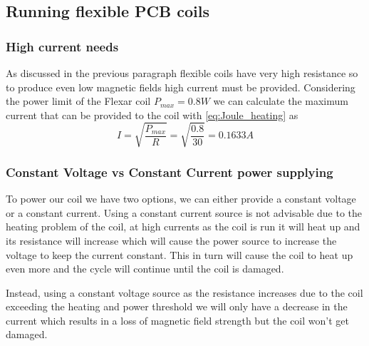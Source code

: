 \subsection{Running flexible PCB coils}

\subsubsection{High current needs}
As discussed in the previous paragraph flexible coils have very high resistance so to produce even low magnetic fields high current must be provided.
Considering the power limit of the Flexar coil $P_{max} = 0.8W$ we can calculate the maximum current that can be provided to the coil with \ref{eq:Joule_heating} as
\begin{equation}
    I = \sqrt{\frac{P_{max}}{R}} = \sqrt{\frac{0.8}{30}} = 0.1633A
\end{equation}

\subsubsection{Constant Voltage vs Constant Current power supplying}
To power our coil we have two options, we can either provide a constant voltage or a constant current.
Using a constant current source is not advisable due to the heating problem of the coil, at high currents as the coil is run it will heat up and its resistance will increase which will cause the power source to increase the voltage to keep the current constant.
This in turn will cause the coil to heat up even more and the cycle will continue until the coil is damaged.

Instead, using a constant voltage source as the resistance increases due to the coil exceeding the heating and power threshold we will only have a decrease in the current which results in a loss of magnetic field strength but the coil won't get damaged.

